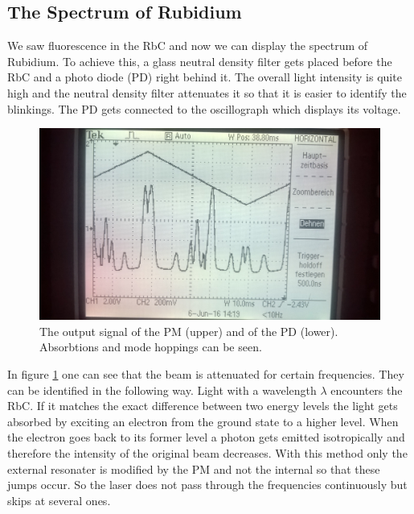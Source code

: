 \subsection{The Spectrum of Rubidium}
We saw fluorescence in the RbC and now we can display the spectrum of Rubidium. To achieve this, a glass neutral density filter gets placed before the RbC and
a photo diode (PD) right behind it. The overall light intensity is quite high and the neutral density filter attenuates it so that it is easier to identify
the blinkings. The PD gets connected to the oscillograph which displays its voltage.
\begin{figure}[t]
 \includegraphics[width=\textwidth]{../pics/peaks.jpg}
 \caption{The output signal of the PM (upper) and of the PD (lower). Absorbtions and mode hoppings can be seen.}
 \label{pic_peak1}
\end{figure}
In figure \ref{pic_peak1} one can see that the beam is attenuated for certain frequencies. They can be identified in the following way. Light with a wavelength
$\lambda$ encounters the RbC. If it matches the exact difference between two energy levels the light gets absorbed by exciting an electron from the ground
state to a higher level. When the electron goes back to its former level a photon gets emitted isotropically and therefore the intensity of the original beam decreases.
With this method only the external resonater is modified by the PM and not the internal so that these jumps occur. So the laser does not pass through the 
frequencies continuously but skips at several ones.

